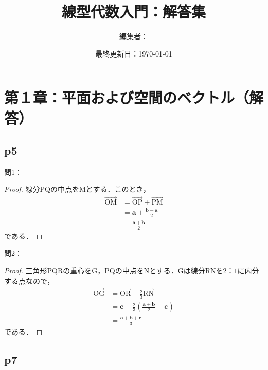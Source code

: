 \documentclass[dvipdfmx,uplatex,11pt]{jsarticle}
\title{線型代数入門：解答集}
\author{編集者：}
\date{最終更新日：\today}
\theoremstyle{definition}
\begin{document}
\maketitle
\tableofcontents
\newpage
%
%
%
\section{第１章：平面および空間のベクトル（解答）}
%
\subsection{p5}

問1：

\begin{leftbar}
	\begin{proof}
		線分PQの中点をMとする．このとき，
		\begin{align*}
		\overrightarrow{\mathrm{OM}} & = \overrightarrow{\mathrm{OP}} + \overrightarrow{\mathrm{PM}} \\
		& = \bm{a} + \frac{\bm{b}-\bm{a}}{2} \\
		& = \frac{\bm{a}+\bm{b}}{2}
		\end{align*}
		である．
	\end{proof}
\end{leftbar}

問2：
\begin{leftbar}
	\begin{proof}
		三角形PQRの重心をG，PQの中点をNとする．Gは線分RNを$2：1$に内分する点なので，
		\begin{align*}
			\overrightarrow{\mathrm{OG}} &= \overrightarrow{\mathrm{OR}} + \frac{2}{3} \overrightarrow{\mathrm{RN}} \\
			& = \bm{c}+ \frac{2}{3} \left(\frac{\bm{a}+\bm{b}}{2}-\bm{c} \right)\\
			& = \frac{\bm{a}+\bm{b}+\bm{c}}{3}
		\end{align*}
		である．
	\end{proof}
\end{leftbar}

\newpage

\subsection{p7}
\end{document}
